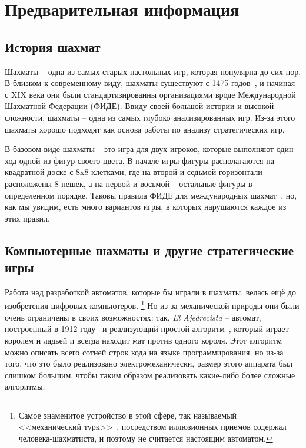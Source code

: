 \documentclass{article}
\begin{document}
\newpage

\tableofcontents

\newpage

\section{Предварительная информация}

\subsection{История шахмат}

Шахматы -- одна из самых старых настольных игр, которая популярна до сих пор.
В близком к современному виду, шахматы существуют с 1475 годов~\cite{world_of_chess},
и начиная с XIX века они были стандартизированны организациями вроде Международной
Шахматной Федерации (ФИДЕ). Ввиду своей большой истории и высокой сложности, шахматы -- 
одна из самых глубоко анализированных игр. Из-за этого шахматы хорошо подходят 
как основа работы по анализу стратегических игр.

В базовом виде шахматы -- это игра для двух игроков,
которые выполняют один ход одной из фигур своего цвета. 
В начале игры фигуры располагаются на квадратной доске с 8x8 клетками,
где на второй и седьмой горизонтали расположены 8 пешек,
а на первой и восьмой -- остальные фигуры в определенном порядке.
Таковы правила ФИДЕ для международных шахмат~\cite{fide-laws},
но, как мы увидим, есть много вариантов игры,
в которых нарушаются каждое из этих правил.

\subsection{Компьютерные шахматы и другие стратегические игры}

Работа над разработкой автоматов, которые бы играли в шахматы,
велась ещё до изобретения цифровых компьютеров.
\footnote{Самое знаменитое устройство в этой сфере, так называемый <<механический турк>>~\cite{mechturk},
посредством иллюзионных приемов содержал человека-шахматиста,
и поэтому не считается настоящим автоматом.}
Но из-за механической природы они были очень ограничены в своих возможностях:
так, \emph{El Ajedrecista} -- автомат, построенный в 1912 году~\cite{ajedrecista-article}
и реализующий простой алгоритм~\cite{ajedrecista-algo}, который играет королем и ладьей
и всегда находит мат против одного короля.
Этот алгоритм можно описать всего сотней строк кода на языке программирования,
но из-за того, что это было реализовано электромеханически,
размер этого аппарата был слишком большим,
чтобы таким образом реализовать какие-либо более сложные алгоритмы.
\end{document}
